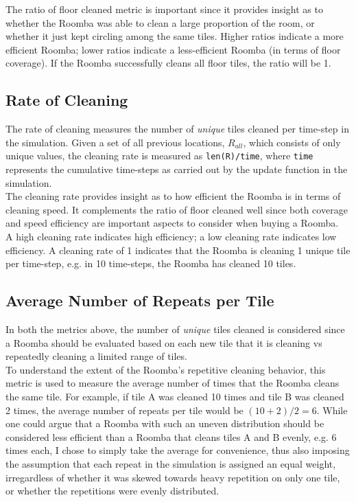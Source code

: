 \documentclass[11pt]{article}
\begin{document}
The ratio of floor cleaned metric is important since it provides insight
as to whether the Roomba was able to clean a large proportion of the
room, or whether it just kept circling among the same tiles. Higher
ratios indicate a more efficient Roomba; lower ratios indicate a
less-efficient Roomba (in terms of floor coverage). If the Roomba
successfully cleans all floor tiles, the ratio will be 1.

\subsection{Rate of Cleaning}

The rate of cleaning measures the number of \emph{unique} tiles cleaned
per time-step in the simulation. Given a set of all previous locations,
\(R_{all}\), which consists of only unique values, the cleaning rate is
measured as \texttt{len(R)/time}, where \texttt{time} represents the
cumulative time-steps as carried out by the update function in the
simulation.\\

The cleaning rate provides insight as to how efficient the Roomba is in
terms of cleaning speed. It complements the ratio of floor cleaned well
since both coverage and speed efficiency are important aspects to
consider when buying a Roomba.\\

A high cleaning rate indicates high efficiency; a low cleaning rate
indicates low efficiency. A cleaning rate of 1 indicates that the Roomba
is cleaning 1 unique tile per time-step, e.g. in 10 time-steps, the
Roomba has cleaned 10 tiles.

\subsection{Average Number of Repeats per Tile}

In both the metrics above, the number of \emph{unique} tiles cleaned is
considered since a Roomba should be evaluated based on each new tile
that it is cleaning vs repeatedly cleaning a limited range of tiles.\\

To understand the extent of the Roomba's repetitive cleaning behavior,
this metric is used to measure the average number of times that the
Roomba cleans the same tile. For example, if tile A was cleaned 10 times
and tile B was cleaned 2 times, the average number of repeats per tile
would be \((10 + 2)/2 = 6\). While one could argue that a Roomba with
such an uneven distribution should be considered less efficient than a
Roomba that cleans tiles A and B evenly, e.g. \(6\) times each, I chose
to simply take the average for convenience, thus also imposing the
assumption that each repeat in the simulation is assigned an equal
weight, irregardless of whether it was skewed towards heavy repetition
on only one tile, or whether the repetitions were evenly distributed.\\
\end{document}
